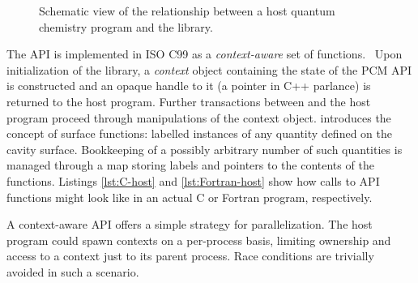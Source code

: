 \begin{figure}[tb]
  \centering
  \scalebox{0.7}{}
  \caption[Schematic view of the relationship between a host quantum chemistry
  program and the \pcmsolver library.]{
  Schematic view of the relationship between a host quantum chemistry
  program and the \pcmsolver library.
  }
  \label{fig:pcmsolver-scheme}
\end{figure}

The \acrshort{API} is implemented in ISO C99 as a \emph{context-aware} set of
functions.~\autocite{library-ronacher, context-api-example}
Upon initialization of the library, a \emph{context} object containing
the state of the \acrshort{PCM} \acrshort{API} is constructed and an
opaque handle to it (a pointer in C++ parlance) is returned to the host
program. Further transactions between \pcmsolver and the host program
proceed through manipulations of the context object.
\pcmsolver introduces the concept of surface functions:
labelled instances of any quantity defined on the cavity surface.
Bookkeeping of a possibly arbitrary number of such quantities is managed
through a map storing labels and pointers to the contents of the
functions.
Listings \ref{lst:C-host} and \ref{lst:Fortran-host} show how calls to
\pcmsolver \acrshort{API} functions might look like in an actual C or Fortran
program, respectively.



A context-aware \acrshort{API} offers a simple strategy for parallelization.
The host program could spawn contexts on a per-process basis,
limiting ownership and access to a context just to its parent process.
Race conditions are trivially avoided in such a scenario.



